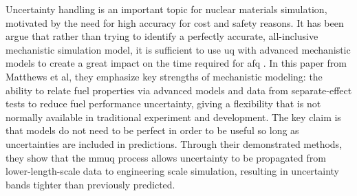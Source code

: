 Uncertainty handling is an important topic for nuclear materials simulation, motivated by the need for high accuracy for cost and safety reasons. It has been argue that rather than trying to identify a perfectly accurate, all-inclusive mechanistic simulation model, it is sufficient to use \gls{uq} with advanced mechanistic models to create a great impact on the time required for \gls{afq} \autocite{matthewsMechanisticMultiscaleUncertainty2026}. In this paper from Matthews et al, they emphasize key strengths of mechanistic modeling: the ability to relate fuel properties via advanced models and data from separate-effect tests to reduce fuel performance uncertainty, giving a flexibility that is not normally available in traditional experiment and development. The key claim is that models do not need to be perfect in order to be useful so long as uncertainties are included in predictions. Through their demonstrated methods, they show that the \gls{mmuq} process allows uncertainty to be propagated from lower-length-scale data to engineering scale simulation, resulting in uncertainty bands tighter than previously predicted.

